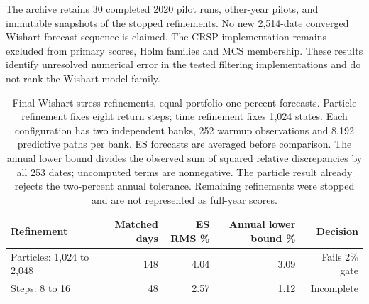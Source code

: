 \documentclass[11pt]{article}
\theoremstyle{definition}\newtheorem{definition}[theorem]{Definition}
\theoremstyle{remark}\newtheorem{remark}[theorem]{Remark}
\begin{document}
The archive retains 30 completed 2020 pilot runs, other-year pilots, and immutable snapshots of the stopped refinements. No new 2,514-date converged Wishart forecast sequence is claimed. The CRSP implementation remains excluded from primary scores, Holm families and MCS membership. These results identify unresolved numerical error in the tested filtering implementations and do not rank the Wishart model family.

\begin{table}[htbp]
\centering\footnotesize
\setlength{\tabcolsep}{5pt}
\begin{tabular}{lrrrr}
\toprule
Refinement & Matched days & ES RMS \% & Annual lower bound \% & Decision \\
\midrule
Particles: 1,024 to 2,048 & 148 & 4.04 & 3.09 & Fails 2\% gate \\
Steps: 8 to 16 & 48 & 2.57 & 1.12 & Incomplete \\
\bottomrule
\end{tabular}
\caption{Final Wishart stress refinements, equal-portfolio one-percent forecasts. Particle refinement fixes eight return steps; time refinement fixes 1,024 states. Each configuration has two independent banks, 252 warmup observations and 8,192 predictive paths per bank. ES forecasts are averaged before comparison. The annual lower bound divides the observed sum of squared relative discrepancies by all 253 dates; uncomputed terms are nonnegative. The particle result already rejects the two-percent annual tolerance. Remaining refinements were stopped and are not represented as full-year scores.}\label{tab:wishart-filter-audit}
\end{table}
\end{document}
